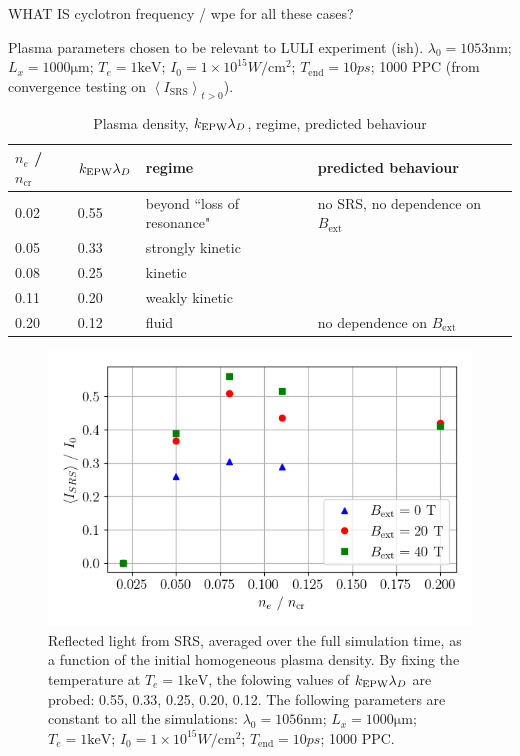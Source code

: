 WHAT IS cyclotron frequency / wpe for all these cases?

Plasma parameters chosen to be relevant to LULI experiment (ish). $\lambda_0 = 1053 \si{\nano\metre}$; $L_x = 1000 \si{\micro\metre}$; $T_e = 1 \si{\kilo\electronvolt}$; $I_0 = 1\times 10^{15}\si{W/\cm^2}$; $T_{\mathrm{end}}=10 \si{ps}$; 1000 PPC (from convergence testing on $\left< I_{\mathrm{SRS}} \right>_{t>0}$).

\begin{table}[h]
\begin{center}

\begin{tabular}{|l|l|l|l|}
\hline
$n_e$ / $n_{\mathrm{cr}}$ & $k_\mathrm{EPW}\lambda_D$ & regime & predicted behaviour\\ \hline \hline
0.02 & 0.55 & beyond ``loss of resonance" & no SRS, no dependence on $B_{\mathrm{ext}}$  \\ \hline
0.05 & 0.33 & strongly kinetic &  \\ \hline
0.08 & 0.25 & kinetic &  \\ \hline
0.11 & 0.20 & weakly kinetic & \\ \hline
0.20 & 0.12 & fluid & no dependence on $B_{\mathrm{ext}}$\\ \hline

\end{tabular}

\end{center}
\caption{Plasma density, $k_\mathrm{EPW}\lambda_D$, regime, predicted behaviour}
\label{tab:predictions}
\end{table}

\begin{figure}[ht]
   \centering
    \includegraphics[width=0.9\columnwidth]{Chapters/C6_magSRS/kld_scan_SRS_scaling.png}
    \caption{Reflected light from SRS, averaged over the full simulation time, as a function of the initial homogeneous plasma density. By fixing the temperature at $T_e = 1\si{\kilo\electronvolt}$, the folowing values of $k_\mathrm{EPW}\lambda_D$ are probed: 0.55, 0.33, 0.25, 0.20, 0.12. The following parameters are constant to all the simulations: 
 $\lambda_0 = 1056 \si{\nano\metre}$; $L_x = 1000 \si{\micro\metre}$; $T_e = 1 \si{\kilo\electronvolt}$; $I_0 = 1\times 10^{15}\si{W/\cm^2}$; $T_{\mathrm{end}}=10 \si{ps}$; 1000 PPC.}
    \label{fig:SRS_EPOCH}
\end{figure}{}

